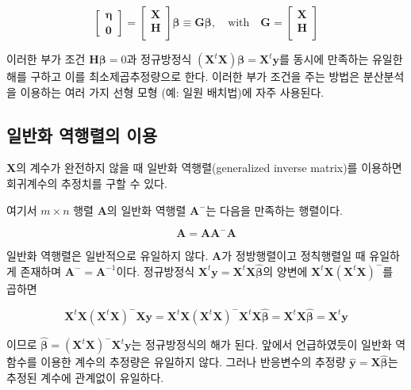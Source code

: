 \documentclass[
]{book}
\theoremstyle{definition}
\theoremstyle{definition}
\theoremstyle{definition}
\theoremstyle{definition}
\theoremstyle{remark}
\begin{document}
\begin{equation*}
\begin{bmatrix}
\bm \eta \\
\bm 0
\end{bmatrix}
=
\begin{bmatrix}
\bm X \\
\bm H \\
\end{bmatrix}
\bm \beta
\equiv
\bm G \bm \beta,
\quad \text{with} \quad
\bm G =
\begin{bmatrix}
\bm X \\
\bm H \\
\end{bmatrix}
\end{equation*}

이러한 부가 조건 \(\bm H \bm \beta =0\)과 정규방정식 \((\bm X^t \bm X ) \bm \beta = \bm X^t \bm y\)를 동시에 만족하는 유일한 해를 구하고 이를 최소제곱추정량으로 한다. 이러한 부가 조건을 주는 방법은 분산분석을 이용하는 여러 가지 선형 모형 (예: 일원 배치법)에 자주 사용된다.

\hypertarget{uxc77cuxbc18uxd654-uxc5eduxd589uxb82cuxc758-uxc774uxc6a9}{%
\subsection{일반화 역행렬의 이용}\label{uxc77cuxbc18uxd654-uxc5eduxd589uxb82cuxc758-uxc774uxc6a9}}

\(\bm X\)의 계수가 완전하지 않을 때 일반화 역행렬(generalized inverse matrix)를 이용하면 회귀계수의 추정치를 구할 수 있다.

여기서 \(m \times n\) 행렬 \(\bm A\)의 일반화 역행렬 \(\bm A^{-}\)는 다음을 만족하는 행렬이다.

\[
\bm A = \bm A \bm A^{-} \bm A
\]

일반화 역행렬은 일반적으로 유일하지 않다. \(\bm A\)가 정방행렬이고 정칙행렬일 때 유일하게 존재하며 \(\bm A^- = \bm A^{-1}\)이다.
정규방정식 \(\bm X^t \bm y=\bm X^t \bm X \hat {\bm \beta}\)의 양변에 \(\bm X^t \bm X (\bm X^t \bm X )^-\)를 곱하면

\[\bm X^t \bm X  (\bm X^t \bm X )^- \bm X \bm y = 
\bm X^t \bm X  (\bm X^t \bm X )^- \bm X^t \bm X \hat {\bm \beta} = 
\bm X^t \bm X  \hat {\bm \beta} = \bm X^t \bm y 
\]

이므로 \(\hat {\bm \beta} = (\bm X^t \bm X )^- \bm X^t \bm y\)는 정규방정식의 해가 된다. 앞에서 언급하였듯이 일반화 역함수를 이용한 계수의 추정량은 유일하지 않다. 그러나 반응변수의 추정량 \(\hat {\bm y} = \bm X \hat {\bm \beta}\)는 추정된 계수에 관계없이 유일하다.
\end{document}
